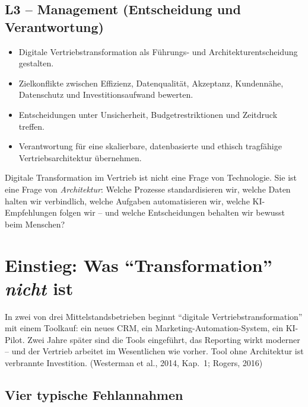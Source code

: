 \documentclass[11pt,a4paper,oneside]{article}
\newcommand{\quelle}[1]{{\footnotesize\color{lpGray}(#1)}}
\begin{document}
\subsection*{L3 -- Management (Entscheidung und Verantwortung)}
\begin{itemize}
  \item Digitale Vertriebstransformation als Führungs- und Architekturentscheidung gestalten.
  \item Zielkonflikte zwischen Effizienz, Datenqualität, Akzeptanz, Kundennähe, Datenschutz und Investitionsaufwand bewerten.
  \item Entscheidungen unter Unsicherheit, Budgetrestriktionen und Zeitdruck treffen.
  \item Verantwortung für eine skalierbare, datenbasierte und ethisch tragfähige Vertriebsarchitektur übernehmen.
\end{itemize}

\begin{merkbox}
Digitale Transformation im Vertrieb ist nicht eine Frage von Technologie. Sie ist eine Frage von \emph{Architektur}: Welche Prozesse standardisieren wir, welche Daten halten wir verbindlich, welche Aufgaben automatisieren wir, welche KI-Empfehlungen folgen wir -- und welche Entscheidungen behalten wir bewusst beim Menschen?
\end{merkbox}

\clearpage

\section{Einstieg: Was ``Transformation'' \emph{nicht} ist}

In zwei von drei Mittelstandsbetrieben beginnt ``digitale Vertriebstransformation'' mit einem Toolkauf: ein neues CRM, ein Marketing-Automation-System, ein KI-Pilot. Zwei Jahre später sind die Tools eingeführt, das Reporting wirkt moderner -- und der Vertrieb arbeitet im Wesentlichen wie vorher. Tool ohne Architektur ist verbrannte Investition. \quelle{Westerman et al., 2014, Kap.~1; Rogers, 2016}

\subsection{Vier typische Fehlannahmen}
\end{document}
